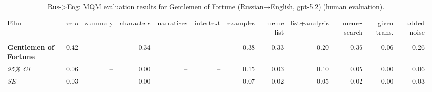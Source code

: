 \begin{table}[ht]
\centering
\begin{adjustbox}{width=\textwidth}
\begin{tabular}{lrrrrrrrrr|rr}
Film & zero & summary & characters & narratives & intertext & examples & meme list & list+analysis & meme-search & \multicolumn{1}{|r}{given trans.} & added noise \\
 &  &  &  &  &  &  &  &  &  &  &  \\
\hline
\textbf{Gentlemen of Fortune} & 0.42 & -- & 0.34 & -- & -- & 0.38 & 0.33 & 0.20 & 0.36 & 0.06 & 0.26 \\

\emph{95\% CI} & 0.06 & -- & 0.00 & -- & -- & 0.15 & 0.03 & 0.10 & 0.05 & 0.00 & 0.06 \\

\emph{SE} & 0.03 & -- & 0.00 & -- & -- & 0.07 & 0.02 & 0.05 & 0.02 & 0.00 & 0.03 \\

\hline
\end{tabular}
\end{adjustbox}
\caption{Rus->Eng: MQM evaluation results for Gentlemen of Fortune (Russian→English, gpt-5.2) (human evaluation).}
\label{tab:gentelmen-eng-human}
\end{table}
